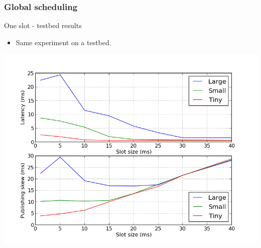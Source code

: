 \documentclass[]{prezentare}
\begin{document}
\begin{frame}
	\frametitle{Global scheduling}
	\begin{block}{One slot - testbed results}

	\begin{itemize}
	\item Same experiment on a testbed.
	\end{itemize}

	\vspace{-5mm}

	\begin{center}
	\includegraphics[scale=0.4]{../Images/one_slot_tbed}
	\end{center}
	\end{block}
\end{frame}
\end{document}
